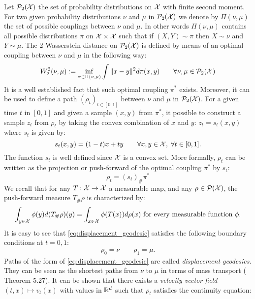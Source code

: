 Let $\mathcal{P}_2({{\mathcal X}})$ the set of probability distributions on ${{\mathcal X}}$ with finite second moment. For two given probability distributions $\nu$ and $\mu$ in $\mathcal{P}_2({{\mathcal X}})$ we denote by $\Pi(\nu,\mu)$ the set of possible couplings between $\nu$ and $\mu$. In other words $\Pi(\nu,\mu)$ contains all possible distributions $\pi$ on ${{\mathcal X}}\times {{\mathcal X}}$ such that if $(X,Y) \sim \pi $ then $X \sim \nu $ and $Y\sim \mu$. The $2$-Wasserstein distance on $\mathcal{P}_2({{\mathcal X}})$ is defined by means of an optimal coupling between $\nu$ and $\mu$ in the following way:
\begin{align}\label{eq:wasserstein_2}
W_2^2(\nu,\mu) := \inf_{\pi\in\Pi(\nu,\mu)} \int \Vert x - y\Vert^2 d\pi(x,y) \qquad \forall \nu, \mu\in \mathcal{P}_2({{\mathcal X}})
\end{align}
It is a well established fact that such optimal coupling $\pi^*$ exists. Moreover, it can be used to define a path $(\rho_t)_{t\in [0,1]}$ between $\nu$ and $\mu$ in $\mathcal{P}_2({{\mathcal X}})$. For a given time $t$ in $[0,1]$ and given a sample $(x,y)$ from $\pi^{*}$, it possible to construct a sample $z_t$ from $\rho_t$ by taking the convex combination of $x$ and $y$: $z_t = s_t(x,y)$ where $s_t$ is given by:
\begin{equation}\label{eq:convex_combination}
s_t(x,y) = (1-t)x+ty \qquad \forall x,y\in {{\mathcal X}}, \; \forall t\in [0,1].
\end{equation}
The function $s_t$ is well defined since ${{\mathcal X}}$ is a convex set. More formally, $\rho_t$ can be written as the projection or push-forward of the optimal coupling $\pi^{*}$ by $s_t$:  
\begin{equation}\label{eq:displacement_geodesic}
\rho_t = (s_t)_{\#}\pi^{*}
\end{equation}
We recall that for any $T: {{\mathcal X}} \rightarrow {{\mathcal X}}$ a measurable map, and any $\rho \in \mathcal{P}({{\mathcal X}})$, the push-forward measure $T_{\#}\rho$ is characterized by:
\begin{align}
\int_{y \in {{\mathcal X}}} \phi(y) d(T_{\#}\rho)(y) =\int_{x \in {{\mathcal X}}}\phi(T(x)) d\rho(x) \text{ for every measurable function $\phi$.}
\end{align}
It is easy to see that \cref{eq:displacement_geodesic} satisfies the following boundary conditions at $t=0,1$:
\begin{align}\label{eq:boundary_conditions}
\rho_0 = \nu \qquad \rho_1 = \mu.
\end{align}
Paths of the form of \cref{eq:displacement_geodesic} are called \textit{displacement geodesics}. They can be seen as the shortest paths from $\nu$ to $\mu$ in terms of mass transport (\cite{Santambrogio:2015} Theorem 5.27). It can be shown that there exists a \textit{velocity vector field} $(t,x)\mapsto v_t(x)$ with values in ${{\mathbb R}}^d$ such that $\rho_t$ satisfies the continuity equation:
